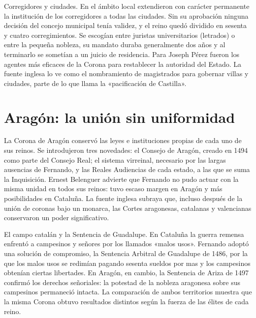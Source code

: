 \documentclass{book}
\begin{document}

Corregidores y ciudades. En el ámbito local extendieron con carácter permanente la institución de los corregidores a todas las ciudades. Sin su aprobación ninguna decisión del concejo municipal tenía validez, y el reino quedó dividido en sesenta y cuatro corregimientos. Se escogían entre juristas universitarios (letrados) o entre la pequeña nobleza, su mandato duraba generalmente dos años y al terminarlo se sometían a un juicio de residencia. Para Joseph Pérez fueron los agentes más eficaces de la Corona para restablecer la autoridad del Estado. La fuente inglesa lo ve como el nombramiento de magistrados para gobernar villas y ciudades, parte de lo que llama la «pacificación de Castilla».


\section{Aragón: la unión sin uniformidad}

La Corona de Aragón conservó las leyes e instituciones propias de cada uno de sus reinos. Se introdujeron tres novedades: el Consejo de Aragón, creado en 1494 como parte del Consejo Real; el sistema virreinal, necesario por las largas ausencias de Fernando, y las Reales Audiencias de cada estado, a las que se suma la Inquisición. Ernest Belenguer advierte que Fernando no pudo actuar con la misma unidad en todos sus reinos: tuvo escaso margen en Aragón y más posibilidades en Cataluña. La fuente inglesa subraya que, incluso después de la unión de coronas bajo un monarca, las Cortes aragonesas, catalanas y valencianas conservaron un poder significativo.


El campo catalán y la Sentencia de Guadalupe. En Cataluña la guerra remensa enfrentó a campesinos y señores por los llamados «malos usos». Fernando adoptó una solución de compromiso, la Sentencia Arbitral de Guadalupe de 1486, por la que los malos usos se redimían pagando sesenta sueldos por mas y los campesinos obtenían ciertas libertades. En Aragón, en cambio, la Sentencia de Ariza de 1497 confirmó los derechos señoriales: la potestad de la nobleza aragonesa sobre sus campesinos permaneció intacta. La comparación de ambos territorios muestra que la misma Corona obtuvo resultados distintos según la fuerza de las élites de cada reino.
\end{document}
